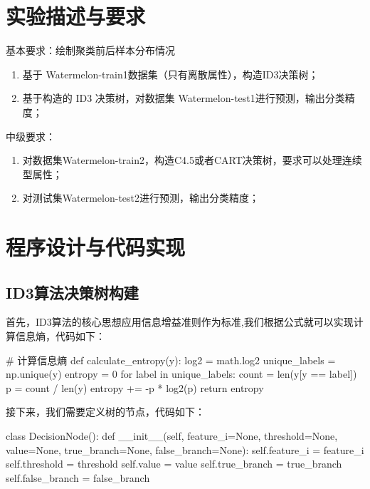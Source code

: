 \documentclass[UTF8,a4paper,10pt]{ctexart}
\begin{document}
\section{实验描述与要求}

基本要求：绘制聚类前后样本分布情况

\begin{enumerate}
    \item 基于 Watermelon-train1数据集（只有离散属性），构造ID3决策树；
    \item 基于构造的 ID3 决策树，对数据集 Watermelon-test1进行预测，输出分类精度；
\end{enumerate}

中级要求：
\begin{enumerate}
    \item 对数据集Watermelon-train2，构造C4.5或者CART决策树，要求可以处理连续型属性；
    \item 对测试集Watermelon-test2进行预测，输出分类精度；
\end{enumerate}

\section{程序设计与代码实现}


\subsection{ID3算法决策树构建}

首先，ID3算法的核⼼思想应用信息增益准则作为标准,我们根据公式就可以实现计算信息熵，代码如下：

\begin{python}
# 计算信息熵
def calculate_entropy(y):
    log2 = math.log2
    unique_labels = np.unique(y)
    entropy = 0
    for label in unique_labels:
        count = len(y[y == label])
        p = count / len(y)
        entropy += -p * log2(p)
    return entropy
\end{python}

接下来，我们需要定义树的节点，代码如下：

\begin{python}
class DecisionNode():
    def __init__(self, feature_i=None, threshold=None,
                 value=None, true_branch=None, false_branch=None):
        self.feature_i = feature_i
        self.threshold = threshold
        self.value = value
        self.true_branch = true_branch
        self.false_branch = false_branch

\end{python}
\end{document}
